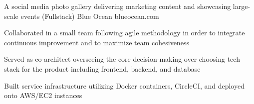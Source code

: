 \begin{cventries}
  \cventry
    {A social media photo gallery delivering marketing content and showcasing large-scale events (Fullstack)} %
    {Blue Ocean} %
    {blueocean.com} %
    {} %
    {
      \begin{cvitems} %
        \item {Collaborated in a small team following agile methodology in order to integrate continuous improvement and to maximize team cohesiveness}
        \item {Served as co-architect overseeing the core decision-making over choosing tech stack for the product including frontend, backend, and database}
        \item {Built service infrastructure utilizing Docker containers, CircleCI, and deployed onto AWS/EC2 instances}
      \end{cvitems}
    }

\end{cventries}
